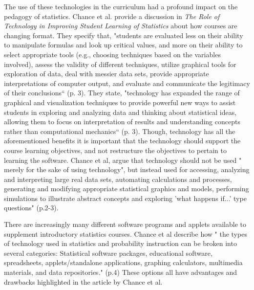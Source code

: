 \documentclass[11pt]{book}
\begin{document}
The use of these technologies in the curriculum had a profound impact on the pedagogy of statistics. Chance et al. provide a discussion in  \emph{The Role of Technology in Improving Student Learning of Statistics} about how courses are changing format.  They specify that, "students are evaluated less on their ability to manipulate formulas and look up critical values, and more on their ability to select appropriate tools (e.g., choosing techniques based on the variables involved), assess the validity of different techniques, utilize graphical tools for exploration of data, deal with messier data sets, provide appropriate interpretations of computer output, and evaluate and communicate the legitimacy of their conclusions`` (p. 3).  They state, "technology has expanded the range of graphical and visualization techniques to provide powerful new ways to assist students in exploring and analyzing data and thinking about statistical ideas, allowing them to focus on interpretation of results and understanding concepts rather than computational mechanics`` (p. 3).    Though, technology has all the aforementioned benefits it is important that the technology should support the course learning objectives, and not restructure the objectives to pertain to learning the software.  Chance et al, argue that technology should not be used " merely for the sake of using technology",  but instead used for accessing, analyzing and interpreting large real data sets, automating calculations and processes, generating and modifying appropriate statistical graphics and models, performing simulations to illustrate abstract concepts and exploring 'what happens if...' type questions" (p.2-3).

There are increasingly many different software programs and applets available to supplement introductory statistics courses.  Chance et al describe how " the types of technology used in statistics and probability instruction can be broken into several categories: Statistical software packages, educational software, spreadsheets, applets/standalone applications, graphing calculators, multimedia materials, and data repositories." (p.4) These options all have advantages and drawbacks highlighted in the article by Chance et al.  
\end{document}
